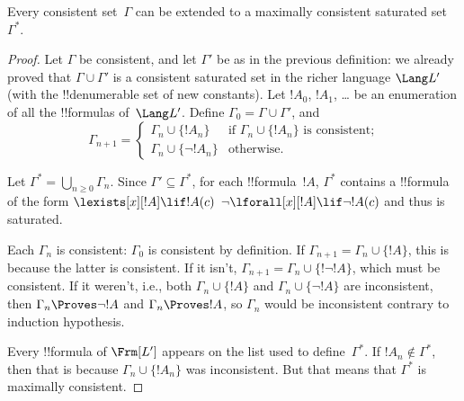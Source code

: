 \documentclass[../../include/open-logic-section]{subfiles}
\begin{document}

\begin{lem}
Every consistent set~$\Gamma$ can be extended to a maximally
consistent saturated set~$\Gamma^*$.
\end{lem}

\begin{proof}
Let $\Gamma$ be consistent, and let $\Gamma'$ be as in the previous
definition: we already proved that $\Gamma \cup \Gamma'$ is a
consistent saturated set in the richer language $\Lang L'$ (with the
!!{denumerable} set of new constants). Let $!A_0$, $!A_1$, \dots{} be
an enumeration of all the !!{formula}s of~$\Lang L'$. Define
$\Gamma_0 = \Gamma \cup \Gamma'$, and
\[
\Gamma_{n+1} =
\begin{cases}
\Gamma_n \cup \{ !A_n \} & \textrm{if $\Gamma_n \cup \{!A_n\}$ is
  consistent;} \\ 
\Gamma_n \cup \{ \lnot !A_n \} & \textrm{otherwise.}
\end{cases}
\]

Let $\Gamma^* = \bigcup_{n \geq 0} \Gamma_n$. Since $\Gamma' \subseteq
\Gamma^*$, for each !!{formula}~$!A$, $\Gamma^*$ contains a
!!{formula} of the form
{$\lexists[x][!A] \lif !A(c)$}
{$\lnot\lforall[x][!A] \lif \lnot !A(c)$}
and thus is saturated.

Each $\Gamma_n$ is consistent: $\Gamma_0$ is consistent by
definition. If $\Gamma_{n+1} = \Gamma_n \cup \{!A\}$, this is because
the latter is consistent.  If it isn't, $\Gamma_{n+1} = \Gamma_n \cup
\{!\lnot !A\}$, which must be consistent.  If it weren't, i.e., both
$\Gamma_n \cup \{!A\}$ and $\Gamma_n \cup \{\lnot !A\}$ are
inconsistent, then $\Gamma_n \Proves \lnot !A$ and $\Gamma_n \Proves
!A$, so $\Gamma_n$ would be inconsistent contrary to induction
hypothesis.

Every !!{formula} of $\Frm[L']$ appears on the list used to
define~$\Gamma^*$.  If $!A_n \notin \Gamma^*$, then that is because
$\Gamma_n \cup \{!A_n\}$ was inconsistent.  But that means that
$\Gamma^*$ is maximally consistent.
\end{proof}
\end{document}
